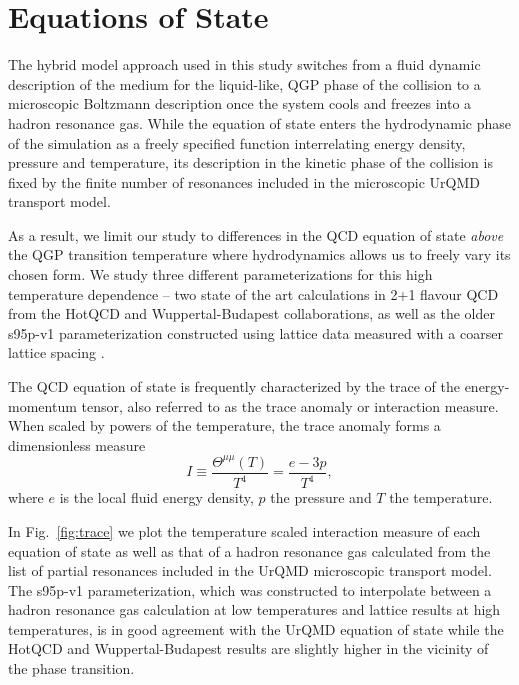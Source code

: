 \documentclass[aps,prc,reprint,amsmath,nofootinbib,superscriptaddress]{revtex4-1}
\begin{document}
\section{Equations of State}

The hybrid model approach used in this study switches from a fluid dynamic description of the medium for the liquid-like, QGP phase of the collision 
to a microscopic Boltzmann description once the system cools and freezes into a hadron resonance gas. While the equation of state enters the hydrodynamic 
phase of the simulation as a freely specified function interrelating energy density, pressure and temperature, its description in the kinetic phase of 
the collision is fixed by the finite number of resonances included in the microscopic UrQMD transport model.

As a result, we limit our study to differences in the QCD equation of state \emph{above} the QGP transition temperature where hydrodynamics allows us to 
freely vary its chosen form. We study three different parameterizations for this high temperature dependence -- two state of the art calculations 
in 2+1 flavour QCD from the HotQCD \cite{Bazavov:2014pvz} and Wuppertal-Budapest \cite{Borsanyi:2013bia} collaborations, as well as the older s95p-v1 
parameterization \cite{Huovinen:2009yb} constructed using lattice data measured with a coarser lattice spacing \cite{Bazavov:2009zn}.

The QCD equation of state is frequently characterized by the trace of the energy-momentum tensor, also referred to as the trace anomaly or interaction measure. 
When scaled by powers of the temperature, the trace anomaly forms a dimensionless measure
\begin{equation}
 I \equiv \frac{\Theta^{\mu\mu}(T)}{T^4} = \frac{e - 3p}{T^4},
\end{equation}
where $e$ is the local fluid energy density, $p$ the pressure and $T$ the temperature.

In Fig.~\ref{fig:trace} we plot the temperature scaled interaction measure of each equation of state as well as that of a hadron resonance gas calculated from 
the list of partial resonances included in the UrQMD microscopic transport model. The s95p-v1 parameterization, which was constructed to interpolate between 
a hadron resonance gas calculation at low temperatures and lattice results at high temperatures, is in good agreement with the UrQMD equation of state while the 
HotQCD and Wuppertal-Budapest results are slightly higher in the vicinity of the phase transition.
\end{document}

